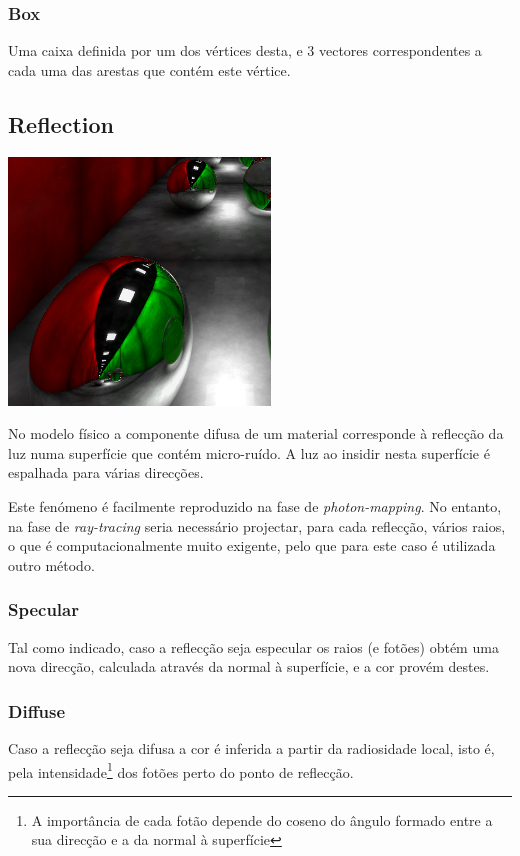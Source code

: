 \documentclass[a4paper]{article}
\begin{document}
\subsubsection{Box}
\indent \indent Uma caixa definida por um dos vértices desta, e 3 vectores correspondentes a cada uma das 
arestas que contém este vértice.

\cleardoublepage
\subsection{Reflection}

\begin{center}
	\includegraphics[scale=0.50]{images/reflection.png}
	\label{fig:reflection}
\end{center}

\indent No modelo físico a componente difusa de um material corresponde à reflecção da luz numa superfície
que contém micro-ruído. A luz ao insidir nesta superfície é espalhada para várias direcções. 

\indent Este fenómeno é facilmente reproduzido na fase de \emph{photon-mapping}.
No entanto, na fase de \emph{ray-tracing} seria necessário projectar, para cada reflecção, vários raios, o que
é computacionalmente muito exigente, pelo que para este caso é utilizada outro método.

\subsubsection{Specular}
\indent \indent Tal como indicado, caso a reflecção seja especular os raios (e fotões) obtém uma nova direcção,
calculada através da normal à superfície, e a cor provém destes. 

\subsubsection{Diffuse}
\indent Caso a reflecção seja difusa a cor é inferida a partir da radiosidade local,
isto é, pela intensidade\footnote{A importância de cada fotão depende do coseno do ângulo formado entre a sua direcção e a da normal à superfície} dos fotões perto do ponto de reflecção.
\end{document}
